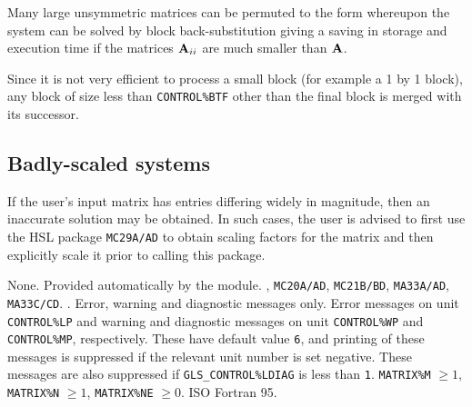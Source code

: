 \documentclass{galahad}
\newcommand{\packagename}{GLS}
\begin{document}
Many large unsymmetric matrices can be permuted to the form
\noindent whereupon the system
can be solved by block back-substitution
giving a saving in storage and execution time if the matrices ${\mathbf{A}}_{ii}$
are much smaller than ${\mathbf{A}}$.

\noindent Since it is not very efficient to process a small block (for example
a {1 by 1} block), any block of size less than {\tt CONTROL\%BTF} other than the
final block is merged with its successor. 

\subsection{Badly-scaled systems}

If the user's input matrix has entries differing widely in
magnitude, then an inaccurate solution may be obtained. In such cases,
the user is advised to first use the HSL package {\tt MC29A/AD} to 
obtain scaling factors for the matrix and then explicitly scale it prior 
to calling this package.


\galgeneral

\galcommon None.
\galworkspace Provided automatically by the module.
, 
{\tt MC20A/AD}, {\tt MC21B/BD}, {\tt MA33A/AD}, {\tt MA33C/CD}.
.
\galio 
Error, warning and diagnostic messages only.  Error messages on unit
{\tt CONTROL\%LP} and warning and diagnostic messages on unit 
{\tt CONTROL\%WP} and {\tt CONTROL\%MP}, respectively.  These have default
value {\tt 6}, and printing of these messages is suppressed if the
relevant unit number is set negative.  These messages are also
suppressed if {\tt \packagename\_CONTROL\%LDIAG} is less than {\tt 1}.
\galrestrictions 
{\tt MATRIX\%M} $\geq 1$, {\tt MATRIX\%N} $\geq 1$, {\tt MATRIX\%NE} $\geq 0$.
\galportability ISO Fortran 95.
\end{document}
